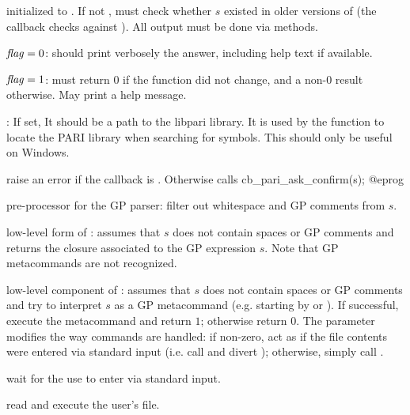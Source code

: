  initialized to . If not , must check whether $s$
existed in older versions of  (the  callback checks against
). All output must be done via  methods.

\item $\hbox{\it f\kern0pt lag\/} = 0$: should print verbosely the answer, including help text if
available.

\item $\hbox{\it f\kern0pt lag\/} = 1$: must return $0$ if the function did not change, and a
non-$0$ result otherwise. May print a help message.


: If set, It should be a path to the libpari library.
It is used by the function  to locate the PARI library when
searching for symbols.  This should only be useful on Windows.


 raise an error if the
callback  is . Otherwise
calls
\bprog
  cb_pari_ask_confirm(s);
@eprog

 pre-processor for the GP
parser: filter out whitespace and GP comments from $s$.

 low-level form of
: assumes that $s$ does not contain spaces or GP comments and
returns the closure associated to the GP expression $s$. Note
that GP metacommands are not recognized.

 low-level component of
: assumes that $s$ does not contain spaces or GP comments and
try to interpret $s$ as a GP metacommand (e.g. starting by \kbd{\bs} or
). If successful, execute the metacommand and return $1$; otherwise
return $0$. The  parameter modifies the way  commands
are handled: if non-zero, act as if the file contents were entered via
standard input (i.e. call  and divert );
otherwise, simply call .

 wait for the use to enter 
via standard input.

 read and execute the user's  file.

